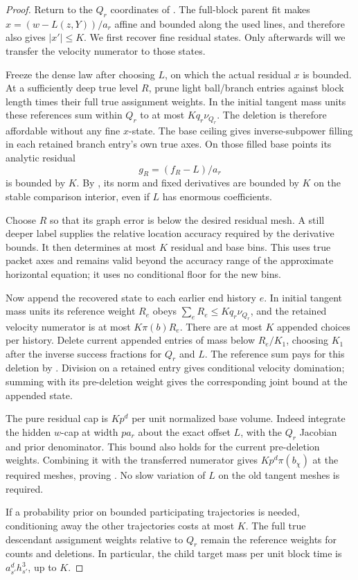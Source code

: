 \begin{proof}
Return to the \(Q_r\) coordinates of
.  The full-block parent fit makes
\(x=(w-L(z,Y))/a_r\) affine and bounded along the used lines, and
therefore also gives \(|x'|\le K\).  We first recover fine residual
states.  Only afterwards will we transfer the velocity numerator
to those states.

Freeze the dense law after choosing \(L\), on which the actual
residual \(x\) is bounded.  At a sufficiently deep true level
\(R\), prune light ball/branch entries against block length times
their full true assignment weights.  In the initial tangent mass
units these references sum within \(Q_r\) to at most
\(Kq_r\nu_{Q_r}\).  The deletion is therefore affordable without
any fine \(x\)-state.  The base ceiling gives inverse-subpower
filling in each retained branch entry's own true axes.  On those
filled base points its analytic residual
\[
 g_R=(f_R-L)/a_r
\]
is bounded by \(K\).  By , its norm and
fixed derivatives are bounded by \(K\) on the stable comparison
interior, even if \(L\) has enormous coefficients.

Choose \(R\) so that its graph error is below the desired residual
mesh.  A still deeper label supplies the relative location accuracy
required by the derivative bounds.  It then determines at most
\(K\) residual and base bins.  This uses true packet axes and
remains valid beyond the accuracy range of the approximate
horizontal equation; it uses no conditional floor for the new bins.

Now append the recovered state to each earlier end history \(e\).
In initial tangent mass units its reference weight \(R_e\) obeys
\(\sum_eR_e\le Kq_r\nu_{Q_r}\), and the retained velocity
numerator is at most \(K\pi(b)R_e\).  There are at most \(K\)
appended choices per history.  Delete current appended entries
of mass below \(R_e/K_1\), choosing \(K_1\) after the inverse
success fractions for \(Q_r\) and \(L\).  The reference sum
pays for this deletion by .
Division on a retained entry gives conditional velocity domination;
summing with its pre-deletion weight gives the corresponding joint
bound at the appended state.

The pure residual cap is \(Kp^d\) per unit normalized base volume.
Indeed integrate the hidden \(w\)-cap at width \(pa_r\) about the
exact offset \(L\), with the \(Q_r\) Jacobian and prior
denominator.  This bound also holds for the current pre-deletion
weights.  Combining it with the transferred numerator gives
\(Kp^d\pi(b_\chi)\) at the required meshes, proving
.  No slow variation of \(L\) on the old
tangent meshes is required.

If a probability prior on bounded participating trajectories is
needed, conditioning away the other trajectories costs at most
\(K\).  The full true descendant assignment weights relative to
\(Q_r\) remain the reference weights for counts and deletions.
In particular, the child target mass per unit block time is
\(a_{s'}^dh_{s'}^3\), up to \(K\).
\end{proof}

